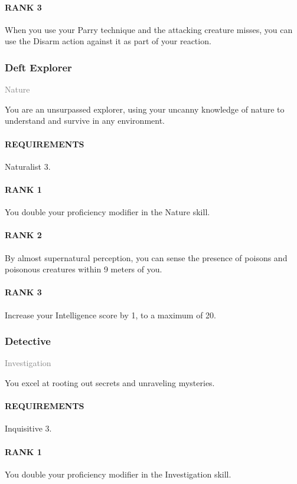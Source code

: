 \paragraph{RANK 3} When you use your Parry technique and the attacking creature misses, you can use the Disarm action against it as part of your reaction.

\subsubsection{Deft Explorer} \label{tal::deftexplorer}
\small{\textcolor{gray}{Nature}}

\normalsize
You are an unsurpassed explorer, using your uncanny knowledge of nature to understand and survive in any environment.
\paragraph{REQUIREMENTS} Naturalist 3.
\paragraph{RANK 1} You double your proficiency modifier in the Nature skill.
\paragraph{RANK 2} By almost supernatural perception, you can sense the presence of poisons and poisonous creatures within 9 meters of you.
\paragraph{RANK 3} Increase your Intelligence score by 1, to a maximum of 20.

\subsubsection{Detective} \label{tal::detective}
\small{\textcolor{gray}{Investigation}}

\normalsize
You excel at rooting out secrets and unraveling mysteries.
\paragraph{REQUIREMENTS} Inquisitive 3.
\paragraph{RANK 1} You double your proficiency modifier in the Investigation skill.
